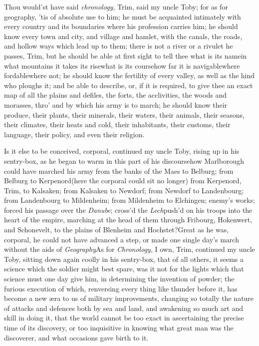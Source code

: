 \documentclass{article}
\begin{document}
\tsh Thou would’st have said \textit{chro\-nology},
Trim, said my uncle Toby;\break
for as for geography, ’tis of absolute use
to him; he must be acquainted intimately
with every country and its boundaries
where his profession carries him; he
should know every town and city, and
village and hamlet, with the canals, the
roads, and hollow ways which lead up to
them; there is not a river or a rivulet he
passes, Trim, but he should be able at
first sight to tell thee what is its
name\tsk in what mountains it takes its 
rise\tsk what is its course\tsk how far it
is navigable\tsk where fordable\tsk where
not; he should know the fertility of every
valley, as well as the hind who ploughs
it; and be able to describe, or, if it is
required, to give thee an exact map of all
the plains and defiles, the forts, the
acclivities, the woods and morasses, thro’
and by which his army is to march; he
should know their produce, their plants,
their minerals, their waters, their
animals, their seasons, their climates,
their heats and cold, their inhabitants,
their customs, their language, their
policy, and even their religion.

Is it else to be conceived, corporal, continued my uncle
Toby, rising up in his sentry-box, as he began to warm in
this part of his discourse\tsk how Marlborough could have
marched his army from the banks of the Maes to
Belburg; from Belburg to Kerpenord\tsk (here the
corporal could sit no longer) from Kerpenord, Trim, to
Kalsaken; from Kalsaken to Newdorf; from
Newdorf to Landenbourg; from Landenbourg to
Mildenheim; from Mildenheim to Elchingen; 
enemy’s works; forced his passage over the \textit{Danube}; cross’d the
\textit{Lech}\tsk push’d on his troops into the heart of the empire, marching at the
head of them through Fribourg, Hokenwert, and Schonevelt, to the plains of Blenheim
and Hochstet?\break\null\tsh Great as he was, corporal, he could
not have advanced a step, or made one single day’s march without the aids of\break
\textit{Geography}\tsh As for \textit{Chronology}, I own, Trim, continued my uncle
Toby, sitting down again coolly in his sentry-box, that of all others, it seems a
science which the soldier might best spare, was it not for the lights which that
science must one day give him, in determining the invention of powder; the furious
execution of which, renversing every thing like thunder before it, has become a new
æra to us of military improvements, changing so totally the nature of attacks and
defences both by sea and land, and awakening so much art and skill in doing it, that
the world cannot be too exact in ascertaining the precise time of its discovery, or
too inquisitive in knowing what great man was the discoverer, and what occasions
gave birth to it.
\end{document}
